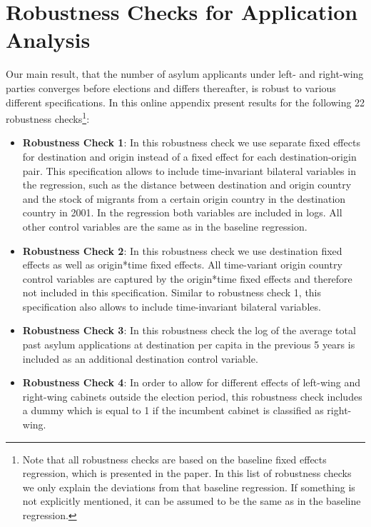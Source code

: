 \documentclass[11pt,a4paper]{scrartcl}
\begin{document}
\section{Robustness Checks for Application Analysis}
Our main result, that the number of asylum applicants under left- and right-wing parties converges before elections and differs thereafter,  is robust to various different specifications. In this online appendix present results for the following 22 robustness checks\footnote{Note that all robustness checks are based on the baseline fixed effects regression, which is presented in the paper. In this list of robustness checks we only explain the deviations from that baseline regression. If something is not explicitly mentioned, it can be assumed to be the same as in the baseline regression.}:
\begin{itemize}
	\item \textbf{Robustness Check 1}: In this robustness check we use separate fixed effects for destination and origin instead of a fixed effect for each destination-origin pair. This specification allows to include time-invariant bilateral variables in the regression, such as the distance between destination and origin country and the stock of migrants from a certain origin country in the destination country in 2001. In the regression both variables are included in logs. All other control variables are the same as in the baseline regression.  
	
	\item \textbf{Robustness Check 2}: In this robustness check we use destination fixed effects as well as origin*time fixed effects. All time-variant origin country control variables are captured by the origin*time fixed effects and therefore not included in this specification. Similar to robustness check 1, this specification also allows to include time-invariant bilateral variables.  
	
	\item \textbf{Robustness Check 3}: In this robustness check the log of the average total past asylum applications at destination per capita in the previous 5 years is included as an additional destination control variable. 
	
	\item \textbf{Robustness Check 4}: In order to allow for different effects of left-wing and right-wing cabinets outside the election period, this robustness check includes a dummy which is equal to 1 if the incumbent cabinet is classified as right-wing.   
	

\end{itemize}
\end{document}
